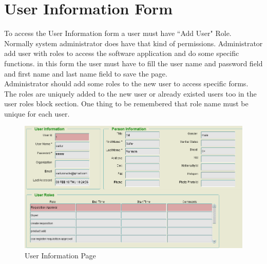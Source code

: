 \documentclass[12pt]{report} %
\begin{document}
\section{User Information Form}
To access the User Information form a user must have ``Add User" Role. Normally system administrator does have that kind of permissions. Administrator add user with roles to access the software application and do some specific functions. in this form the user must have to fill the user name and password field and first name and last name field to save the page.\\
Administrator should add some roles to the new user to access specific forms. The roles are uniquely added to the new user or already existed users too in the user roles block section. One thing to be remembered that role name must be unique for each user. %
\begin{figure}[h]
	\begin{center}
		\includegraphics[width=1\textwidth]{pic/user_info_page.PNG}
	\end{center}
	\caption{User Information Page}
	\label{fig:user_info_page}
\end{figure}

\clearpage




\end{document}
